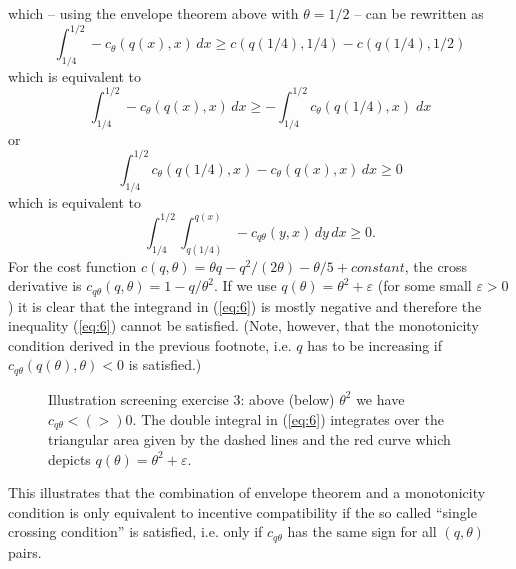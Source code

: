 \documentclass[a4paper,11pt]{article}
\begin{document}
which -- using the envelope theorem above with $\theta =1/2$ -- can be rewritten as 
\begin{equation*}
  \int_{1/4}^{1/2} -c_\theta (q(x),x)\,dx\geq c(q(1/4),1/4)-c(q(1/4),1/2)
\end{equation*}
which is equivalent to 
\begin{equation*}
  \int_{1/4}^{1/2} -c_\theta (q(x),x)\,dx\geq -\int_{1/4}^{1/2} c_\theta (q(1/4),x)\; dx
\end{equation*}
or 
\begin{equation*}
  \int_{1/4}^{1/2} c_\theta (q(1/4),x)-c_\theta (q(x),x)\,dx\geq 0
\end{equation*}
which is equivalent to
\begin{equation}
  \label{eq:6}
  \int_{1/4}^{1/2}\int_{q(1/4)}^{q(x)} -c_{q\theta} (y,x)\,dy\,dx\geq 0.
\end{equation}
For the cost function $c(q,\theta )=\theta  q-q^2/(2\theta )-\theta /5+constant$, the cross derivative is $c_{q\theta }(q,\theta )=1-q/\theta ^2$. If we use $q(\theta )=\theta ^2+\varepsilon $ (for some small $\varepsilon >0$) it is clear that the integrand in (\ref{eq:6}) is mostly negative and therefore the inequality (\ref{eq:6}) cannot be satisfied. (Note, however, that the monotonicity condition derived in the previous footnote, i.e. $q$ has to be increasing if $c_{q\theta }(q(\theta ),\theta )<0$ is satisfied.)

\begin{figure}[h]
  \centering
  \caption{Illustration screening exercise 3: above (below) $\theta ^2$ we have $c_{q\theta }<(>)0$. The double integral in (\ref{eq:6}) integrates over the triangular area given by the dashed lines and the red curve which depicts $q(\theta )=\theta ^2+\varepsilon $.}
  \label{fig:nosc}
\end{figure}
\par
This illustrates that the combination of envelope theorem and a monotonicity condition is only equivalent to incentive compatibility if the so called ``single crossing condition'' is satisfied, i.e. only if $c_{q\theta }$ has the same sign for all $(q,\theta )$ pairs. 
\end{document}
